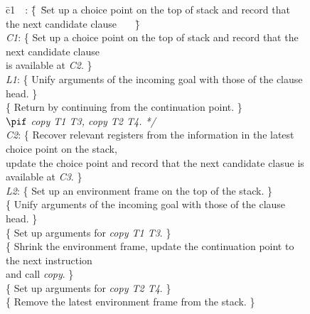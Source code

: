 \begin{figure}\footnotesize
\begin{tabbing}
\quad\= c1\ \ : \=\{\ \=Set up a choice point on the top of stack and record that the next candidate clause \ \ \ \=\}\kill
{}                                                                                     \\
\> {\it C1}:  \>\{  \>Set up a choice point on the top of stack and record that the next candidate clause       \\
\>            \>    \>is available at {\it C2}.                                                            \>\} \\
\> {\it L1}:  \>\{  \>Unify arguments of the incoming goal with those of the clause head.                  \>\} \\
\>            \>\{  \>Return by continuing from the continuation point.                                    \>\} \\
 $\pif$ {\it copy T1 T3, copy T2 T4. */}                             \\
\> {\it C2}:  \>\{ \>Recover relevant registers from the information in the latest choice point on the stack,      \\
\>            \>   \>update the choice point and record that the next candidate clasue is available at {\it C3}. \>\} \\
\> {\it L2}:  \>\{ \>Set up an environment frame on the top of the stack.                                        \>\} \\
\>            \>\{ \>Unify arguments of the incoming goal with those of the clause head.                         \>\} \\
\>            \>\{ \>Set up arguments for {\it copy T1 T3}.                                                      \>\} \\
\>            \>\{ \>Shrink the environment frame, update the continuation point to the next instruction              \\
\>            \>   \>and call {\it copy}.                                                                        \>\} \\
\>            \>\{ \>Set up arguments for {\it copy T2 T4}.                                                      \>\} \\
\>            \>\{ \>Remove the latest environment frame from the stack.                                            \>\} \\

\end{tabbing}
\end{figure}
